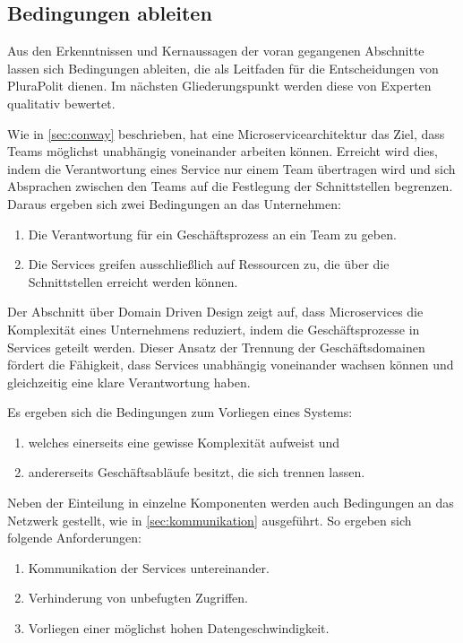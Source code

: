 \subsection{Bedingungen ableiten}
\label{sec:bedingungen}

Aus den Erkenntnissen und Kernaussagen der voran gegangenen Abschnitte lassen sich Bedingungen ableiten, die als Leitfaden für die Entscheidungen von PluraPolit dienen. Im nächsten Gliederungspunkt werden diese von Experten qualitativ bewertet.

Wie in \cref{sec:conway} beschrieben, hat eine Microservicearchitektur das Ziel, dass Teams möglichst unabhängig voneinander arbeiten können. Erreicht wird dies, indem die Verantwortung eines Service nur einem Team übertragen wird und sich Absprachen zwischen den Teams auf die Festlegung der Schnittstellen begrenzen. Daraus ergeben sich zwei Bedingungen an das Unternehmen:
\begin{enumerate}
	\item Die Verantwortung für ein Geschäftsprozess an ein Team zu geben.
	\item Die Services greifen ausschließlich auf Ressourcen zu, die über die Schnittstellen erreicht werden können.
\end{enumerate}

Der Abschnitt über Domain Driven Design zeigt auf, dass Microservices die Komplexität eines Unternehmens reduziert, indem die Geschäftsprozesse in Services geteilt werden. Dieser Ansatz der Trennung der Geschäftsdomainen fördert die Fähigkeit, dass Services unabhängig voneinander wachsen können und gleichzeitig eine klare Verantwortung haben.

Es ergeben sich die Bedingungen zum Vorliegen eines Systems:
\begin{enumerate}
	\item welches einerseits eine gewisse Komplexität aufweist und
	\item andererseits Geschäftsabläufe besitzt, die sich trennen lassen.
\end{enumerate}

Neben der Einteilung in einzelne Komponenten werden auch Bedingungen an das Netzwerk gestellt, wie in \cref{sec:kommunikation} ausgeführt. So ergeben sich folgende Anforderungen:
\begin{enumerate}
	\item Kommunikation der Services untereinander.
	\item Verhinderung von unbefugten Zugriffen.
	\item Vorliegen einer möglichst hohen Datengeschwindigkeit.
\end{enumerate}

